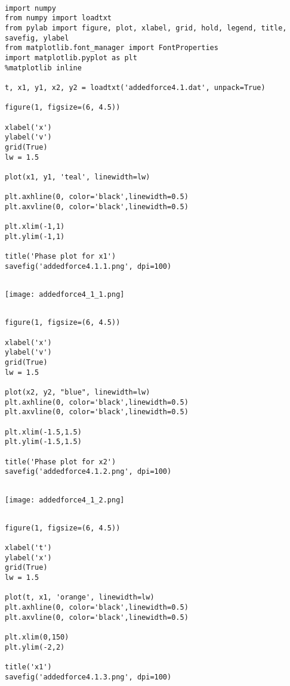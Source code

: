 \documentclass{article} %
\begin{document}
\begin{verbatim} 

import numpy 
from numpy import loadtxt
from pylab import figure, plot, xlabel, grid, hold, legend, title, savefig, ylabel
from matplotlib.font_manager import FontProperties
import matplotlib.pyplot as plt
%matplotlib inline

t, x1, y1, x2, y2 = loadtxt('addedforce4.1.dat', unpack=True)

figure(1, figsize=(6, 4.5))

xlabel('x')
ylabel('v')
grid(True)
lw = 1.5

plot(x1, y1, 'teal', linewidth=lw)

plt.axhline(0, color='black',linewidth=0.5)
plt.axvline(0, color='black',linewidth=0.5)

plt.xlim(-1,1)
plt.ylim(-1,1)

title('Phase plot for x1')
savefig('addedforce4.1.1.png', dpi=100)


\end{verbatim}


\begin{center}
	\texttt{[image: addedforce4\_1\_1.png]}
\end{center}


\begin{verbatim} 

figure(1, figsize=(6, 4.5))

xlabel('x')
ylabel('v')
grid(True)
lw = 1.5

plot(x2, y2, "blue", linewidth=lw)
plt.axhline(0, color='black',linewidth=0.5)
plt.axvline(0, color='black',linewidth=0.5)

plt.xlim(-1.5,1.5)
plt.ylim(-1.5,1.5)

title('Phase plot for x2')
savefig('addedforce4.1.2.png', dpi=100)


\end{verbatim}


\begin{center}
	\texttt{[image: addedforce4\_1\_2.png]}
\end{center}



\begin{verbatim} 

figure(1, figsize=(6, 4.5))

xlabel('t')
ylabel('x')
grid(True)
lw = 1.5

plot(t, x1, 'orange', linewidth=lw)
plt.axhline(0, color='black',linewidth=0.5)
plt.axvline(0, color='black',linewidth=0.5)

plt.xlim(0,150)
plt.ylim(-2,2)

title('x1')
savefig('addedforce4.1.3.png', dpi=100)


\end{verbatim}
\end{document}
